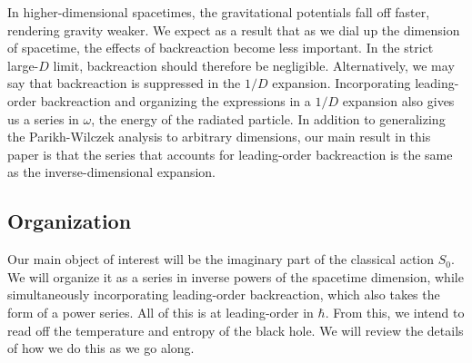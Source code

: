 \documentclass[a4paper,11pt]{article}
\begin{document}
In higher-dimensional spacetimes, the gravitational potentials fall off faster, rendering gravity weaker. We expect as a result that as we dial up the dimension of spacetime, the effects of backreaction become less important. In the strict large-$D$ limit, backreaction should therefore be negligible. Alternatively, we may say that backreaction is suppressed in the $1/D$ expansion. Incorporating leading-order backreaction and organizing the expressions in a $1/D$ expansion also gives us a series in $\omega$, the energy of the radiated particle. In addition to generalizing the Parikh-Wilczek analysis to arbitrary dimensions, our main result in this paper is that the series that accounts for leading-order backreaction is the same as the inverse-dimensional expansion.

\subsection*{Organization}
Our main object of interest will be the imaginary part of the classical action $S_0$. We will organize it as a series in inverse powers of the spacetime dimension, while simultaneously incorporating leading-order backreaction, which also takes the form of a power series. All of this is at leading-order in $\hbar$. From this, we intend to read off the temperature and entropy of the black hole. We will review the details of how we do this as we go along.
\end{document}
